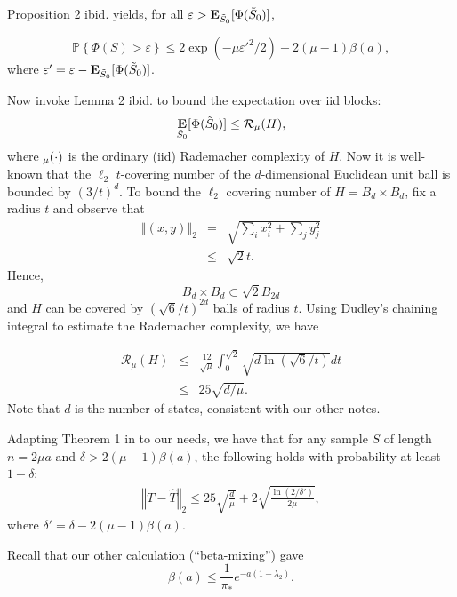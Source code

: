 \documentclass[11pt]{article}
\newcommand{\calR}{\mathcal R}
\renewcommand{\P}[1]{\mathbb{P}\left\{#1\right\}}
\newcommand{\eps}{\varepsilon}
\theoremstyle{plain}
\theoremstyle{definition}
\theoremstyle{remark}
\DeclareMathOperator*{\E}{\text{\bf E}}
\newcommand{\oo}[1]{\frac{1}{#1}}
\newcommand{\nrm}[1]{\left\Vert #1 \right\Vert}
\newcommand{\beq}{\begin{eqnarray*}}
\newcommand{\eeq}{\end{eqnarray*}}
\begin{document}
Proposition 2 ibid. yields, for all
$\eps>\E_{\tilde S_0}[\Phi(\tilde S_0)]$,


$$ \P{\Phi(S)>\eps} \le
2\exp(-\mu{\eps'}^2/2)+2(\mu-1)\beta(a),
$$
where $\eps'=\eps-\E_{\tilde S_0}[\Phi(\tilde S_0)]$.


Now invoke Lemma 2 ibid. to bound the expectation over iid blocks:
$$ \E_{\tilde S_0}[\Phi(\tilde S_0)] \le \calR_\mu(H),$$
where $\cal_\mu(\cdot)$ is the ordinary (iid) Rademacher complexity of
$H$.
Now it is well-known \cite{MR1965359} that the $\ell_2$
$t$-covering number of the $d$-dimensional Euclidean unit ball is
bounded by $(3/t)^d$. 
To bound the $\ell_2$ covering number of $H=B_d\times B_d$,
fix a radius $t$ and
observe that
\beq
\nrm{(x,y)}_2 &=& \sqrt{ \sum_i x_i^2 + \sum_j y_j^2} \\
&\le& \sqrt2 t.
\eeq
Hence,
$$ B_d\times B_d \subset \sqrt2 B_{2d} $$
and $H$
can be covered by
$(\sqrt 6/t)^{2d}$ balls of radius $t$.
Using Dudley's chaining integral to estimate
the Rademacher complexity, we have

\beq
\calR_\mu(H) &\le& \frac{12}{\sqrt\mu}\int_0^{\sqrt2}\sqrt{d\ln(\sqrt 6/t)}dt \\
&\le& 25\sqrt{d/\mu}.
\eeq
Note that $d$ is the number of states, consistent with our other notes.

Adapting Theorem 1 in \cite{mohri-rosta08} to our needs, we have
that for any sample $S$ of length $n=2\mu a$
and $\delta>2(\mu-1)\beta(a)$,
the following
holds with probability at least $1-\delta$:
\beq
\nrm{T-\hat T}_2
\le 25\sqrt{\frac{d}{\mu}} + 2\sqrt{\frac{\ln(2/\delta')}{2\mu}},
\eeq
where $\delta'=\delta-2(\mu-1)\beta(a)$.

Recall that our other calculation (``beta-mixing'') gave
$$ \beta(a) \le \oo{\pi_*}e^{-a(1-\lambda_2)}.$$



\end{document}
